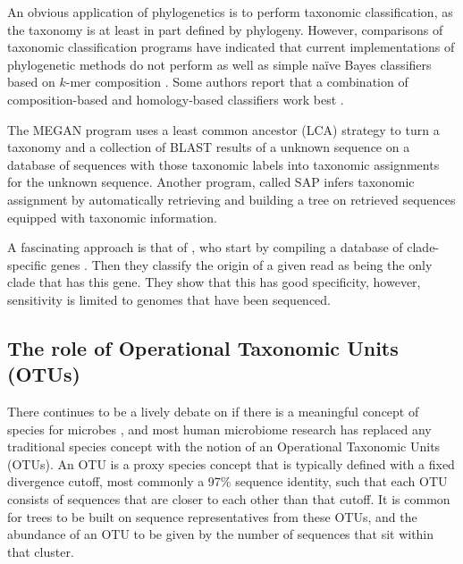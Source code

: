 \documentclass{amsart}
\begin{document}
An obvious application of phylogenetics is to perform taxonomic classification, as the taxonomy is at least in part defined by phylogeny.
However, comparisons of taxonomic classification programs \citep{liu2008accurate,bazinet2012comparative} have indicated that current implementations of phylogenetic methods do not perform as well as simple na\"ive Bayes classifiers based on $k$-mer composition \citep{wang2007naive,rosen2008metagenome}.
Some authors report that a combination of composition-based and homology-based classifiers work best \citep{brady2009phymm,parks2011classifying}.

The MEGAN program \citep{huson2007megan,huson2011integrative} uses a least common ancestor (LCA) strategy to turn a taxonomy and a collection of BLAST results of a unknown sequence on a database of sequences with those taxonomic labels into taxonomic assignments for the unknown sequence.
Another program, called SAP \citep{munch2008fast,munch2008statistical} infers taxonomic assignment by automatically retrieving  and building a tree on retrieved sequences equipped with taxonomic information.

A fascinating approach is that of \citet{segata2012metagenomic}, who start by compiling a database of clade-specific genes \citep{segata2011metagenomic}.
Then they classify the origin of a given read as being the only clade that has this gene.
They show that this has good specificity, however, sensitivity is limited to genomes that have been sequenced.

\subsection{The role of Operational Taxonomic Units (OTUs)}
There continues to be a lively debate on if there is a meaningful concept of species for microbes \citep{bapteste2009prokaryotic,caro2012bacterial}, and most human microbiome research has replaced any traditional species concept with the notion of an Operational Taxonomic Units (OTUs).
An OTU is a proxy species concept that is typically defined with a fixed divergence cutoff, most commonly a 97\% sequence identity, such that each OTU consists of sequences that are closer to each other than that cutoff.
It is common for trees to be built on sequence representatives from these OTUs, and the abundance of an OTU to be given by the number of sequences that sit within that cluster.
\end{document}
